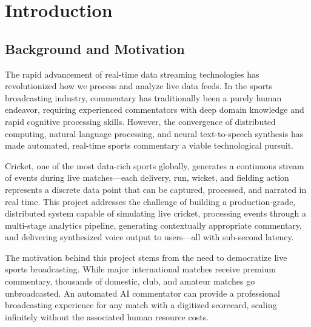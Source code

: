 \section{Introduction}

\subsection{Background and Motivation}
The rapid advancement of real-time data streaming technologies has revolutionized how we process and analyze live data feeds. In the sports broadcasting industry, commentary has traditionally been a purely human endeavor, requiring experienced commentators with deep domain knowledge and rapid cognitive processing skills. However, the convergence of distributed computing, natural language processing, and neural text-to-speech synthesis has made automated, real-time sports commentary a viable technological pursuit.

Cricket, one of the most data-rich sports globally, generates a continuous stream of events during live matches---each delivery, run, wicket, and fielding action represents a discrete data point that can be captured, processed, and narrated in real time. This project addresses the challenge of building a production-grade, distributed system capable of simulating live cricket, processing events through a multi-stage analytics pipeline, generating contextually appropriate commentary, and delivering synthesized voice output to users---all with sub-second latency.

The motivation behind this project stems from the need to democratize live sports broadcasting. While major international matches receive premium commentary, thousands of domestic, club, and amateur matches go unbroadcasted. An automated AI commentator can provide a professional broadcasting experience for any match with a digitized scorecard, scaling infinitely without the associated human resource costs.


